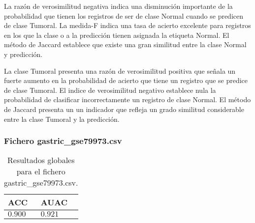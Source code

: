 \bigbreak

La razón de verosimilitud negativa indica una disminución importante de la probabilidad que tienen los registros de ser de clase Normal cuando se predicen de clase Tumoral. La medida-F indica una tasa de acierto excelente para registros en los que la clase o a la predicción tienen asignada la etiqueta Normal. El método de Jaccard establece que existe una gran similitud entre la clase Normal y predicción.

\bigbreak

La clase Tumoral presenta una razón de verosimilitud positiva que señala  un fuerte aumento en la probabilidad de acierto que tiene un registro que se predice de clase Tumoral. El indice de verosimilitud negativo establece nula la probabilidad de clasificar incorrectamente un registro de clase Normal. El método de Jaccard presenta un un indicador que refleja un grado similitud considerable entre la clase Tumoral y la predicción. 

\clearpage



\subsubsection{Fichero gastric\_gse79973.csv}

\begin{table}[htp]
    \small
    \centering
    \begin{tabularx}{\columnwidth}{Y Y}
        ACC       & AUAC    \\\hline
        $0.900$   & $0.921$ \\\hline
    \end{tabularx}
    \caption{Resultados globales para el fichero gastric\_gse79973.csv.}
    \label{tab:18}
\end{table}

